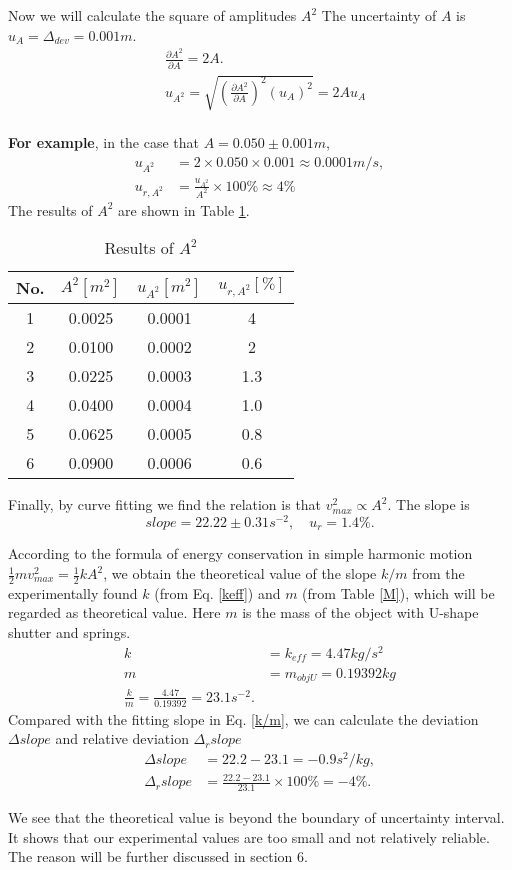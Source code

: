     Now we will calculate the square of amplitudes $A^2$ The uncertainty of $A$ is $u_A=\Delta_{dev}=0.001m$.
    \[
    \begin{split}
        &\frac{\partial A^2}{\partial A}=2A.\\
        &u_{A^2}=\sqrt{(\frac{\partial A^2}{\partial A})^2(u_A)^2}=2Au_A\\[0.4cm]
    \end{split}
    \]

    \textbf{For example}, in the case that $A=0.050\pm 0.001m$,
    \[
    \begin{split}
        u_{A^2}&=2\times0.050\times0.001\approx0.0001m/s,\\
        u_{r,A^2}&=\frac{u_{A^2}}{A^2}\times100\%\approx4\%
    \end{split}
    \]
    The results of $A^2$ are shown in Table \ref{adata2}.
    \begin{table}[!h] \small
        \centering
        \begin{tabular}{|c|c|c|c|}
            \hline
            No. & $A^2[m^2]$ & $u_{A^2}[m^2]$ & $u_{r,A^2}[\%]$\\ \hline
            1 & 0.0025 & 0.0001 & 4\\ \hline
            2 & 0.0100 & 0.0002 & 2\\ \hline
            3 & 0.0225 & 0.0003 & 1.3\\ \hline
            4 & 0.0400 & 0.0004 & 1.0\\ \hline
            5 & 0.0625 & 0.0005 & 0.8\\ \hline
            6 & 0.0900 & 0.0006 & 0.6\\ \hline
        \end{tabular}
        \caption{Results of $A^2$}\label{adata2}
    \end{table}

    Finally, by curve fitting we find the relation is that $v_{max}^2\propto A^2$. The slope is
    \begin{equation}\label{k/m}
        slope=22.22\pm0.31s^{-2}, \quad u_r=1.4\%.
    \end{equation}

    According to the formula of energy conservation in simple harmonic motion $\frac{1}{2}mv_{max}^2=\frac{1}{2}kA^2$, we obtain the theoretical value of the slope $k/m$ from the experimentally found $k$ (from Eq. \ref{keff}) and $m$ (from Table \ref{M}), which will be regarded as theoretical value. Here $m$ is the mass of the object with U-shape shutter and springs.
    \[
    \begin{split}
        k&=k_{eff}=4.47kg/s^2\\
        m&=m_{objU}=0.19392kg\\
        \frac{k}{m}=\frac{4.47}{0.19392}=23.1s^{-2}.
    \end{split}
    \]
    Compared with the fitting slope in Eq. \ref{k/m}, we can calculate the deviation $\Delta slope$ and relative deviation $\Delta_r slope$
    \[
    \begin{split}
        \Delta slope&=22.2-23.1=-0.9s^2/kg,\\
        \Delta_r slope&=\frac{22.2-23.1}{23.1}\times 100\%=-4\%.
    \end{split}
    \]

    We see that the theoretical value is beyond the boundary of uncertainty interval. It shows that our experimental values are too small and not relatively reliable. The reason will be further discussed in section 6.
